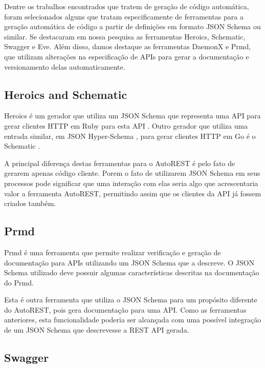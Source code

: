 Dentre os trabalhos encontrados que tratem de geração de código automática, foram selecionados alguns que tratam especificamente de ferramentas para a geração automática de código a partir de definições em formato JSON Schema ou similar. Se destacaram em nossa pesquisa as ferramentas Heroics, Schematic, Swagger e Eve. Além disso, damos destaque as ferramentas DaemonX e Prmd, que utilizam alterações na especificação de APIs para gerar a documentação e versionamento delas automaticamente.


\subsection{Heroics and Schematic}

Heroics é um gerador que utiliza um JSON Schema que representa uma API para gerar clientes HTTP em Ruby para esta API \cite{HEROICS}. Outro gerador que utiliza uma entrada similar, em JSON Hyper-Schema \cite{JSHYPERSCH}, para gerar clientes HTTP em Go é o Schematic \cite{SCHEMATIC}.

A principal diferença destas ferramentas para o AutoREST é pelo fato de gerarem apenas código cliente. Porem o fato de utilizarem JSON Schema em seus processos pode significar que uma interação com elas seria algo que acrescentaria valor a ferramenta AutoREST, permitindo assim que os clientes da API já fossem criados também.


\subsection{Prmd}

Prmd \cite{PRMD} é uma ferramenta que permite realizar verificação e geração de documentação para APIs utilizando um JSON Schema que a descreve. O JSON Schema utilizado deve possuir algumas características descritas na documentação do Prmd.

Esta é outra ferramenta que utiliza o JSON Schema para um propósito diferente do AutoREST, pois gera documentação para uma API. Como as ferramentas anteriores, esta funcionalidade poderia ser alcançada com uma possível integração de um JSON Schema que descrevesse a REST API gerada.


\subsection{Swagger}

